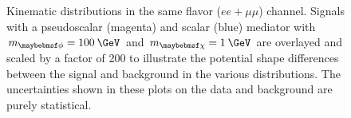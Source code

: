\begin{figure}
  \caption{Kinematic distributions in the same flavor ($ee+\mu\mu$) channel. Signals with a pseudoscalar (magenta) and scalar (blue) mediator with $\mMed=100\:\GeV$ and $\mDM=1\:\GeV$ are overlayed and scaled by a factor of 200 to illustrate the potential shape differences between the signal and background in the various distributions. The uncertainties shown in these plots on the data and background are purely statistical.}
  \label{fig:dilep_sr_sf}
\end{figure}

